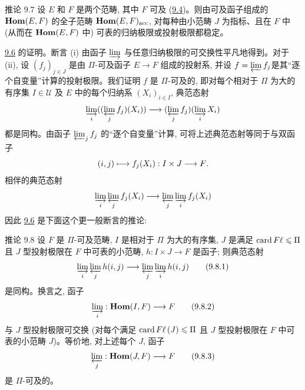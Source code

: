 \begin{enonce*}{推论 9.7}
设 $E$ 和 $F$ 是两个范畴, 其中 $F$ 可及 (\hyperref[I.def9.4]{9.4})。则由可及函子组成的 $\operatorname{\mathbf{Hom}}(E,F)$ 的全子范畴 $\operatorname{\mathbf{Hom}}(E,F)_{\operatorname{acc}}$, 对每种由小范畴 $J$ 为指标、且在 $F$ 中 (从而在 $\operatorname{\mathbf{Hom}}(E,F)$ 中) 可表的归纳极限或投射极限都稳定。
\end{enonce*}

\hyperref[I.prop9.6]{9.6} 的证明。断言 (i) 由函子 $\varinjlim$ 与任意归纳极限的可交换性平凡地得到。对于 (ii), 设 $(f_j)_{j\in J}$ 是由 $\Pi$-可及函子 $E\rightarrow F$ 组成的投射系, 并设 $f=\varprojlim
f_j$\pageoriginale 是其“逐个自变量”计算的投射极限。我们证明 $f$ 是 $\Pi$-可及的, 即对每个相对于 $\Pi$ 为大的有序集 $I\in 𝒰$ 及 $E$ 中的每个归纳系 $(X_i)_{i\in I}$, 典范态射
$$
\varinjlim_i ((\varprojlim_j f_j)(X_i))\longrightarrow
(\varprojlim_j f_j) (\varinjlim_i X_i)
$$
都是同构。由函子 $\varprojlim_j f_j$ 的“逐个自变量”计算, 可将上述典范态射等同于与双函子
$$
(i,j)\longmapsto f_j(X_i):I\times J\longrightarrow F{}.
$$
相伴的典范态射
$$
\varinjlim_i \varprojlim_j f_j (X_i)\longrightarrow \varprojlim_j
\varinjlim_i f_j (X_i)
$$
因此 \hyperref[I.prop9.6]{9.6} 是下面这个更一般断言的推论:


\begin{enonce*}{推论 9.8}
设 $F$ 是 $\Pi$-可及范畴, $I$ 是相对于 $\Pi$ 为大的有序集, $J$ 是满足 $\operatorname{card} F\ell\leqslant
\Pi$ 且 $J$ 型投射极限在 $F$ 中可表的小范畴, $h:I\times J\rightarrow F$ 是函子; 则典范态射
\hypertarget{sga4.exp.I.equation.9.8.1}{}\begin{equation}
\varinjlim_i \varprojlim_j h(i,j)\longrightarrow \varprojlim_j
\varinjlim_i h(i,j)\tag{9.8.1}
\end{equation}
是同构。换言之, 函子
\hypertarget{sga4.exp.I.equation.9.8.2}{}\begin{equation}
\varinjlim_i:\operatorname{\mathbf{Hom}}(I,F)\longrightarrow F\tag{9.8.2}
\end{equation}
与 $J$ 型投射极限可交换 (对每个满足 $\operatorname{card} F\ell\,(J)\leqslant\Pi$ 且 $J$ 型投射极限在 $F$ 中可表的小范畴 $J$\pageoriginale)。等价地, 对上述每个 $J$, 函子
\hypertarget{sga4.exp.I.equation.9.8.3}{}\begin{equation}
\varprojlim_j:\operatorname{\mathbf{Hom}}(J,F)\longrightarrow F\tag{9.8.3}
\end{equation}
是 $\Pi$-可及的。
\end{enonce*}

